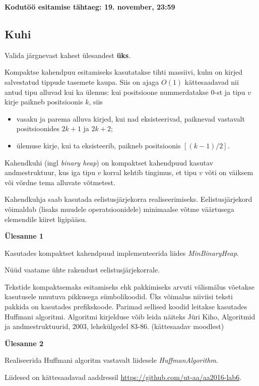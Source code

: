 \documentclass[a4paper]{article}
\begin{document}
\textbf{Kodutöö esitamise tähtaeg: 19. november, 23:59}

{\center
\subsection*{Kuhi}
}

Valida järgnevast kahest ülesandest \textbf{üks}.

Kompaktse kahendpuu esitamiseks kasutatakse tihti massiivi, kuhu on kirjed
salvestatud tippude tasemete kaupa. Siis on ajaga $O(1)$ kättesaadavad nii antud
tipu alluvad kui ka ülemus: kui positsioone nummerdatakse 0-st ja tipu $v$
kirje paikneb positsioonis $k$, siis

\begin{itemize}
\item vasaku ja parema alluva kirjed, kui nad eksisteerivad, paiknevad vastavalt
positsioonides $2k + 1$ ja $2k + 2$;
\item ülemuse kirje, kui ta eksisteerib, paikneb positsioonis $[(k - 1) / 2]$.
\end{itemize}

Kahendkuhi (ingl \textit{binary heap}) on kompaktset kahendpuud kasutav andmestruktuur, kus iga tipu $v$ korral kehtib tingimus, et tipu $v$ võti on väiksem või võrdne tema alluvate võtmetest. 

Kahendkuhja saab kasutada eelistusjärjekorra realiseerimiseks. Eelistusjärjekord võimaldab (lisaks muudele operatsioonidele) minimaalse võtme väärtusega elemendile kiiret ligipääsu. 
  
\begin{problem}
\textbf{Ülesanne 1}

Kasutades kompaktset kahendpuud implementeerida liides \textit{MinBinaryHeap}.
\end{problem}

Nüüd vaatame ühte rakendust eelistusjärjekorrale.
 
Tekstide kompaktsemaks esitamiseks ehk pakkimiseks arvuti välismälus võetakse
kasutusele muutuva pikkusega sümbolikoodid. Üks võimalus niiviisi
teksti pakkida on kasutades prefikskoode. Parimad sellised koodid leitakse
kasutades Huffmani algoritmi. Algoritmi kirjelduse võib leida näiteks Jüri Kiho,
Algoritmid ja andmestruktuurid, 2003, lehekülgedel 83-86. (kättesaadav moodlest)

\begin{problem}
\textbf{Ülesanne 2}

Realiseerida Huffmani algoritm vastavalt liidesele \textit{HuffmanAlgorithm}.
\end{problem}

Liidesed on kättesaadavad aaddressil \url{https://github.com/ut-aa/aa2016-lab6}.
\end{document}
